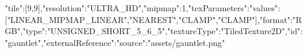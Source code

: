 {"tile":[9,9],"resolution":"ULTRA_HD","mipmap":1,"texParameters":{"values":["LINEAR_MIPMAP_LINEAR","NEAREST","CLAMP","CLAMP"]},"format":"RGB","type":"UNSIGNED_SHORT_5_6_5","textureType":"TiledTexture2D","id":"gauntlet","externalReference":{"source":"assets/gauntlet.png"}}
